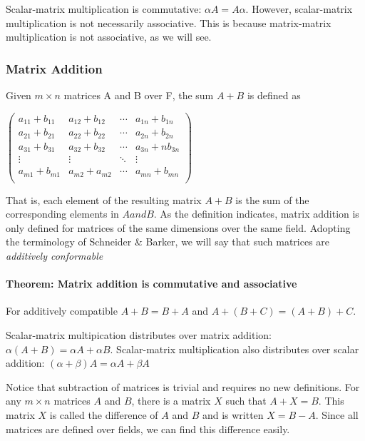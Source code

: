 \documentclass[12pt,letterpaper,final]{article}
\begin{document}
Scalar-matrix multiplication is commutative: $\alpha A = A \alpha$. However, scalar-matrix multiplication is not necessarily associative. This is because matrix-matrix multiplication is not associative, as we will see. 
\subsubsection{Matrix Addition}

Given $m \times n$ matrices A and B over F, the sum $A + B$ is defined as 

$
 \begin{pmatrix}
a_{11}+b_{11} &  a_{12}+b_{12} &  \cdots &   a_{1n}+b_{1n} \\
 a_{21}+b_{21} &  a_{22}+b_{22} &  \cdots &   a_{2n}+b_{2n}\\
 a_{31}+b_{31} &  a_{32}+b_{32} &  \cdots &    a_{3n}+nb_{3n}\\
  \vdots  & \vdots  & \ddots & \vdots  \\
 a_{m1}+b_{m1} &  a_{m2}+a_{m2} &  \cdots &   a_{mn}+b_{mn}\\
 \end{pmatrix}
$

That is, each element of the resulting  matrix $A+B$ is the sum of the corresponding elements in $A and B$. As the definition indicates, matrix addition is only defined for matrices of the same dimensions over the same field. Adopting the terminology of Schneider \& Barker, we will say that such matrices are \textit{additively conformable} 

\paragraph{Theorem: Matrix addition is commutative and associative} For additively compatible  $A + B = B + A$ and $A+ (B + C) = (A +B)+C$. 

Scalar-matrix multipication distributes over matrix addition: $\alpha (A+B) = \alpha A + \alpha B$. Scalar-matrix multiplication also distributes over scalar addition: $(\alpha + \beta) A = \alpha A + \beta A$

Notice that subtraction of matrices is trivial and requires no new definitions. For any $m \times n$ matrices $A$ and $B$, there is a matrix $X$ such that $A + X = B$. This matrix $X$ is called the difference of $A$ and $B$ and is written $X = B - A$. Since all matrices are defined over fields, we can  find this difference easily. 
\end{document}
